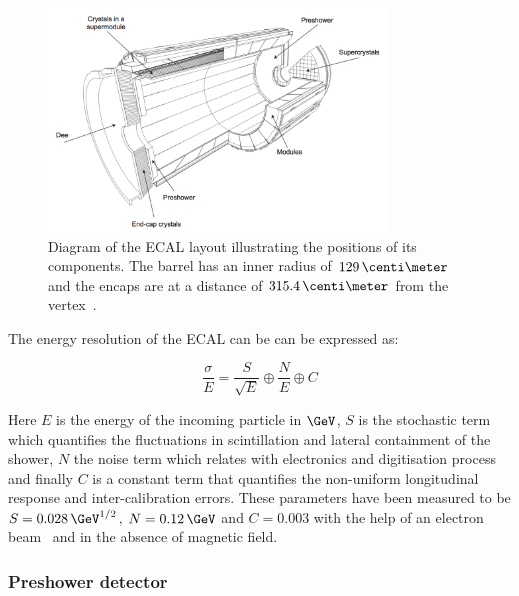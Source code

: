\begin{figure}[!htb]
  \centering
  \includegraphics[width=0.8\textwidth]{Chapter02/CMS/Images/CMS_ECAL_Layout.png}
  \caption{Diagram of the ECAL layout illustrating the positions of its components. The barrel has an inner radius of $129\,\centi\meter$ and the encaps are at a distance of $315.4\,\centi\meter$ from the vertex~\cite{ARTICLE:TheCMSExperiment}.}
  \label{FIGURE:ExperimentalApparatus_CMS_ECAL_Layout}
\end{figure}
 
The energy resolution of the \gls{ECAL} can be can be expressed as: 

\begin{equation}
\frac{\sigma}{E} = \frac{S}{\sqrt{E}} \oplus \frac{N}{E} \oplus C
\end{equation}

Here $E$ is the energy of the incoming particle in $\GeV$, $S$ is the stochastic term which quantifies the fluctuations in scintillation and lateral containment of the shower, $N$ the noise term which relates with electronics and digitisation process and finally $C$ is a constant term that quantifies the non-uniform longitudinal response and inter-calibration errors. These parameters have been measured to be  $S=0.028\,\GeV^{1/2}$, $N=0.12\,\GeV$ and $C=0.003$ with the help of an electron beam~\cite{ARTICLE:CMSECALTestBeam} and in the absence of magnetic field.

\subsubsection{Preshower detector}
\label{SUBSUBSECTION:ExperimentalApparatus_CMS_ECAL_Preshower}

